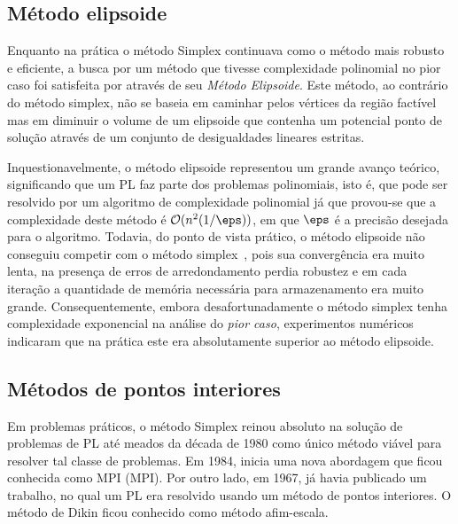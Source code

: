 \subsection{Método elipsoide}

Enquanto na prática o método Simplex continuava como o método mais robusto e
eficiente, a busca por um método que tivesse complexidade polinomial no pior
caso foi satisfeita por \textcite{Khachiyan:A-polynomial-algorithm:1979y} através
de seu  \emph{Método Elipsoide}.
Este método, ao contrário do método simplex,  não se baseia em caminhar pelos
vértices da região factível mas em diminuir o volume de um elipsoide que
contenha um potencial ponto de solução através de um conjunto de desigualdades
lineares estritas.

Inquestionavelmente, o método elipsoide representou um grande avanço teórico,
significando que um \ac{PL} faz parte dos problemas polinomiais, isto é, que
pode ser resolvido por um algoritmo de complexidade polinomial já que provou-se
que a complexidade deste método é  $\mathcal{O}(n^2(1/\eps))$, em
que $\eps$ é a precisão desejada para o algoritmo.
Todavia, do ponto de vista prático, o método elipsoide não conseguiu competir com o
método simplex~\cite{Bland:1981vn}, pois sua convergência era muito lenta, na
presença de erros de arredondamento perdia robustez e em cada iteração a
quantidade de memória necessária para armazenamento era muito grande.
Consequentemente, embora desafortunadamente o método simplex tenha complexidade
exponencial na análise do \emph{pior caso}, experimentos numéricos indicaram que
na prática este era absolutamente superior ao método elipsoide.


\subsection{Métodos de pontos interiores}



Em problemas práticos, o método Simplex reinou absoluto na solução de problemas
de \ac{PL} até meados da década de 1980 como único método viável para resolver
tal classe de problemas. Em 1984, \textcite{Karmarkar:1984cp} inicia uma nova
abordagem que ficou conhecida como 
\acl{MPI} (\ac{MPI}). Por outro lado,  em 1967,
\textcite{DIKIN:InterativeSol1967} já havia publicado um trabalho, no qual um 
\ac{PL} era resolvido usando um método de pontos interiores. O método de Dikin ficou
conhecido como método afim-escala.
      
